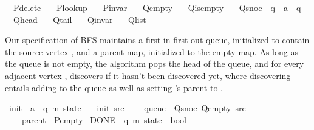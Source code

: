 \begin{isabellebody}
\ \ P{\isacharunderscore}{\kern0pt}delete\ \isanewline
\ \ P{\isacharunderscore}{\kern0pt}lookup\ \isanewline
\ \ P{\isacharunderscore}{\kern0pt}invar\ \isanewline
\ \ Q{\isacharunderscore}{\kern0pt}empty\ \isanewline
\ \ Q{\isacharunderscore}{\kern0pt}is{\isacharunderscore}{\kern0pt}empty\ \isanewline
\ \ Q{\isacharunderscore}{\kern0pt}snoc\ {\isacharcolon}{\kern0pt}{\isacharcolon}{\kern0pt}\ {\isachardoublequoteopen}{\isacharprime}{\kern0pt}q\ {\isasymRightarrow}\ {\isacharprime}{\kern0pt}a\ {\isasymRightarrow}\ {\isacharprime}{\kern0pt}q{\isachardoublequoteclose}\ \isanewline
\ \ Q{\isacharunderscore}{\kern0pt}head\ \isanewline
\ \ Q{\isacharunderscore}{\kern0pt}tail\ \isanewline
\ \ Q{\isacharunderscore}{\kern0pt}invar\ \isanewline
\ \ Q{\isacharunderscore}{\kern0pt}list\isanewline
{}%
\begin{isamarkuptext}%
Our specification of BFS maintains a first-in first-out queue, initialized to contain the source
vertex , and a parent map, initialized to the empty map. As long as the queue is not
empty, the algorithm pops the head  of the queue, and for every adjacent vertex ,
discovers  if it hasn't been discovered yet, where discovering  entails adding
 to the queue as well as setting 's parent to .%
\end{isamarkuptext}\isamarkuptrue%
\isamarkupfalse%
\ init\ {\isacharcolon}{\kern0pt}{\isacharcolon}{\kern0pt}\ {\isachardoublequoteopen}{\isacharprime}{\kern0pt}a\ {\isasymRightarrow}\ {\isacharparenleft}{\kern0pt}{\isacharprime}{\kern0pt}q{\isacharcomma}{\kern0pt}\ {\isacharprime}{\kern0pt}m{\isacharparenright}{\kern0pt}\ state{\isachardoublequoteclose}\ \isanewline
\ \ {\isachardoublequoteopen}init\ src\ {\isasymequiv}\isanewline
\ \ \ {\isasymlparr}queue\ {\isacharequal}{\kern0pt}\ Q{\isacharunderscore}{\kern0pt}snoc\ Q{\isacharunderscore}{\kern0pt}empty\ src{\isacharcomma}{\kern0pt}\isanewline
\ \ \ \ parent\ {\isacharequal}{\kern0pt}\ P{\isacharunderscore}{\kern0pt}empty{\isasymrparr}{\isachardoublequoteclose}\isanewline
\isanewline
{}\isamarkupfalse%
\ DONE\ {\isacharcolon}{\kern0pt}{\isacharcolon}{\kern0pt}\ {\isachardoublequoteopen}{\isacharparenleft}{\kern0pt}{\isacharprime}{\kern0pt}q{\isacharcomma}{\kern0pt}\ {\isacharprime}{\kern0pt}m{\isacharparenright}{\kern0pt}\ state\ {\isasymRightarrow}\ bool{\isachardoublequoteclose}\ \isanewline

\end{isabellebody}
